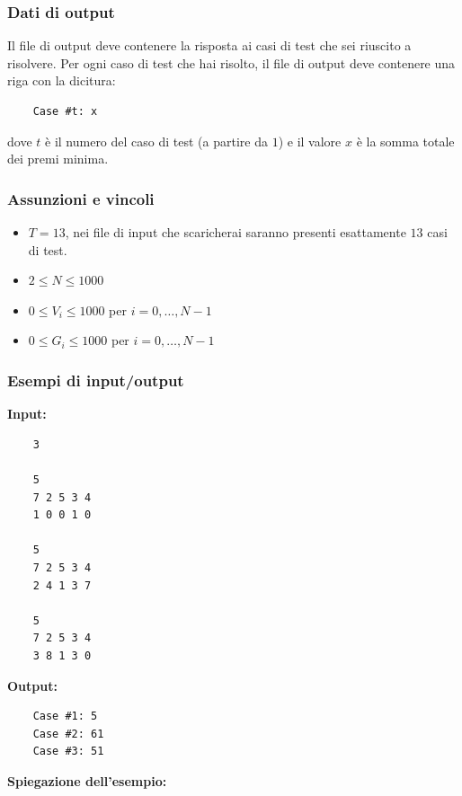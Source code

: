\subsubsection*{Dati di output}

Il file di output deve contenere la risposta ai casi di test che sei riuscito a risolvere. Per ogni caso di test che hai risolto, il file di output deve contenere una riga con la dicitura:

\medskip

\begin{verbatim}
	Case #t: x
\end{verbatim}

\medskip
dove $t$ è il numero del caso di test (a partire da \(1\)) e il valore $x$ è la somma totale dei premi minima.

\subsubsection*{Assunzioni e vincoli}

\begin{itemize}
	\item \(T = 13\), nei file di input che scaricherai saranno presenti esattamente \(13\) casi di test.
	\item \(2 \le N \le 1000\)
	\item \(0 \le V_i \le 1000\) per \(i = 0, \dots, N-1\)
	\item \(0 \le G_i \le 1000\) per \(i = 0, \dots, N-1\)
\end{itemize}


\subsubsection*{Esempi di input/output}

\textbf{Input:}  
\begin{verbatim}
	3
	
	5
	7 2 5 3 4
	1 0 0 1 0
	
	5
	7 2 5 3 4
	2 4 1 3 7
	
	5
	7 2 5 3 4
	3 8 1 3 0
\end{verbatim}

\smallskip  
\textbf{Output:}  
\begin{verbatim}
	Case #1: 5
	Case #2: 61
	Case #3: 51
\end{verbatim}

\bigskip

\noindent\textbf{Spiegazione dell'esempio:}

